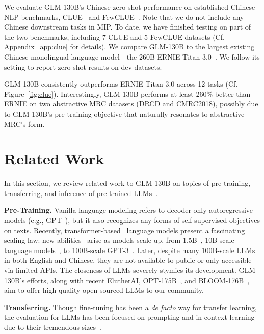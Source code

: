 We evaluate GLM-130B's Chinese zero-shot performance on established Chinese NLP benchmarks, CLUE~\citep{xu2020clue} and FewCLUE~\citep{xu2021fewclue}. Note that we do not include any Chinese downstream tasks in MIP. To date, we have finished testing on part of the two benchmarks, including 7 CLUE and 5 FewCLUE datasets (Cf. Appendix~\ref{app:clue} for details). We compare GLM-130B to the largest existing Chinese monolingual language model---the 260B ERNIE Titan 3.0~\citep{wang2021ernie}. We follow its setting to report zero-shot results on dev datasets. 

GLM-130B consistently outperforms ERNIE Titan 3.0 across 12 tasks (Cf. Figure~\ref{fig:clue}). 
Interestingly, GLM-130B performs at least 260\% better than ERNIE on two abstractive MRC datasets (DRCD and CMRC2018), possibly due to GLM-130B's pre-training objective that naturally resonates to abstractive MRC's form. 

\section{Related Work} In this section, we review related work to GLM-130B on topics of pre-training, transferring, and inference of pre-trained LLMs~\citep{qiu2020pre,bommasani2021opportunities}.

\textbf{Pre-Training.}
Vanilla language modeling refers to decoder-only autoregressive models (e.g., GPT~\citep{radford2018improving}), but it also recognizes any forms of self-supervised objectives on texts. Recently, transformer-based~\citep{vaswani2017attention} language models present a fascinating scaling law: new abilities~\citep{wei2022emergent} arise as models scale up, from 1.5B~\citep{radford2019language}, 10B-scale language models~\citep{raffel2020exploring,shoeybi2019megatron,black2022gpt}, to 100B-scale GPT-3~\citep{brown2020language}. Later, despite many 100B-scale LLMs~\citep{lieber2021jurassic,thoppilan2022lamda,rae2021scaling,smith2022using,chowdhery2022palm,wu2021yuan,zeng2021pangu,wang2021ernie} in both English and Chinese, they are not available to public or only accessible via limited APIs. The closeness of LLMs severely stymies its development. GLM-130B's efforts, along with recent ElutherAI, OPT-175B~\citep{zhang2022opt}, and BLOOM-176B~\citep{scao2022what}, aim to offer high-quality open-sourced LLMs to our community.

\textbf{Transferring.}
Though fine-tuning has been a \textit{de facto} way for transfer learning, the evaluation for LLMs has been focused on prompting and in-context learning due to their tremendous sizes~\citep{brown2020language,liu2021pre}.

